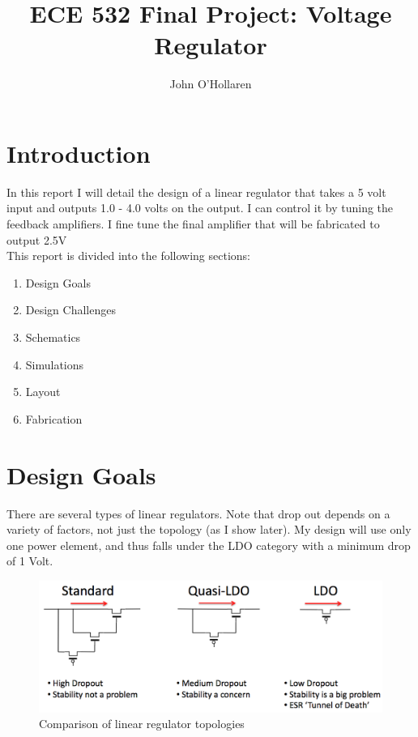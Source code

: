 \documentclass[10pt]{amsart}
\title{ECE 532 Final Project: Voltage Regulator}
\author{John O'Hollaren}
\begin{document}
\maketitle

\section{Introduction}
In this report I will detail the design of a linear regulator that takes a 5 volt input and outputs 1.0 - 4.0 volts on the output. I can control it by tuning the feedback amplifiers. I fine tune the final amplifier that will be fabricated to output 2.5V\\

This report is divided into the following sections:
\begin{enumerate}
\item Design Goals
\item Design Challenges
\item Schematics
\item Simulations
\item Layout
\item Fabrication
\end{enumerate}

\newpage

\section{Design Goals}

There are several types of linear regulators. Note that drop out depends on a variety of factors, not just the topology (as I show later). My design will use only one power element, and thus falls under the LDO category with a minimum drop of 1 Volt.

\begin{figure}[h]
	\begin{center}
		\includegraphics[width=6in]{Media/ldos.png}
	\end{center}
	\caption{Comparison of linear regulator topologies}
	\label{fig:wl}
\end{figure}
\end{document}
